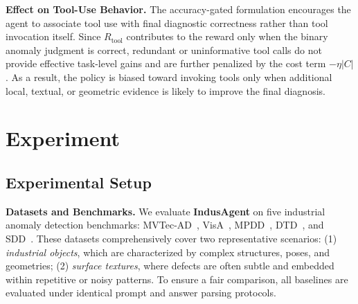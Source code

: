 \documentclass{llmxive}
\begin{document}

\textbf{Effect on Tool-Use Behavior.}
The accuracy-gated formulation encourages the agent to associate tool use with final diagnostic correctness rather than tool invocation itself. 
Since $R_{\text{tool}}$ contributes to the reward only when the binary anomaly judgment is correct, redundant or uninformative tool calls do not provide effective task-level gains and are further penalized by the cost term $-\eta |C|$. 
As a result, the policy is biased toward invoking tools only when additional local, textual, or geometric evidence is likely to improve the final diagnosis.


\section{Experiment}


\subsection{Experimental Setup}
\label{sec:experiments_setup}

\textbf{Datasets and Benchmarks.}
We evaluate \textbf{IndusAgent} on five industrial anomaly detection benchmarks: MVTec-AD~\citep{mvtec}, VisA~\citep{visa}, MPDD~\citep{mpdd}, DTD~\citep{dtd}, and SDD~\citep{sdd}. 
These datasets comprehensively cover two representative scenarios: (1) \emph{industrial objects}, which are characterized by complex structures, poses, and geometries; (2) \emph{surface textures}, where defects are often subtle and embedded within repetitive or noisy patterns. 
To ensure a fair comparison, all baselines are evaluated under identical prompt and answer parsing protocols.
\end{document}
